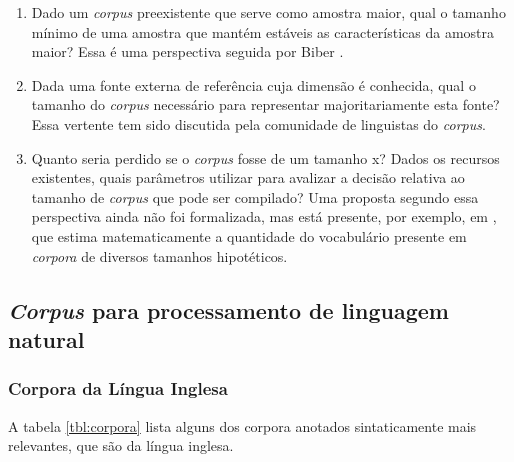 \begin{enumerate}
\begin{enumerate}
\item Dado um \emph{corpus} preexistente que serve como amostra maior, qual o tamanho mínimo de uma amostra que mantém estáveis as características da amostra maior? Essa é uma perspectiva seguida por Biber \cite{biber90,biber93}.

\item Dada uma fonte externa de referência cuja dimensão é conhecida, qual o tamanho do \emph{corpus} necessário para representar majoritariamente esta fonte? Essa vertente tem sido discutida pela comunidade de linguistas do \emph{corpus}.

\item Quanto seria perdido se o \emph{corpus} fosse de um tamanho x? Dados os recursos existentes, quais parâmetros utilizar para avalizar a decisão relativa ao tamanho de \emph{corpus} que pode ser compilado? Uma proposta segundo essa perspectiva ainda não foi formalizada, mas está presente, por exemplo, em \cite{cantossanches97.2,cantossanchez97}, que estima matematicamente a quantidade do vocabulário presente em \emph{corpora} de diversos tamanhos hipotéticos.
\end{enumerate}

\end{enumerate}

\newpage

\subsection{\emph{Corpus} para processamento de linguagem natural} %
\label{sub:corpus_pln}


\subsubsection{Corpora da Língua Inglesa}
\label{sub:corpus_ingles}

A tabela \ref{tbl:corpora} lista alguns dos corpora anotados sintaticamente mais relevantes, que são da língua inglesa.

